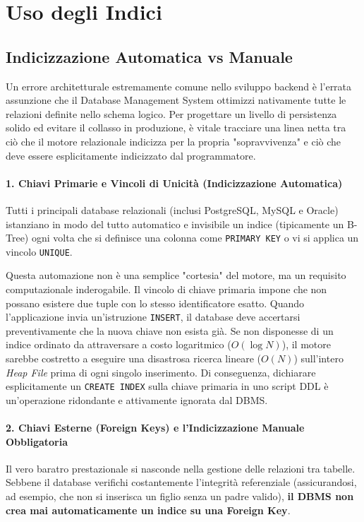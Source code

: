 \section{Uso degli Indici}

\subsection{Indicizzazione Automatica vs Manuale}

Un errore architetturale estremamente comune nello sviluppo backend è l'errata assunzione che il Database Management System ottimizzi nativamente tutte le relazioni definite nello schema logico. Per progettare un livello di persistenza solido ed evitare il collasso in produzione, è vitale tracciare una linea netta tra ciò che il motore relazionale indicizza per la propria "sopravvivenza" e ciò che deve essere esplicitamente indicizzato dal programmatore.

\paragraph{1. Chiavi Primarie e Vincoli di Unicità (Indicizzazione Automatica)}
Tutti i principali database relazionali (inclusi PostgreSQL, MySQL e Oracle) istanziano in modo del tutto automatico e invisibile un indice (tipicamente un B-Tree) ogni volta che si definisce una colonna come \texttt{PRIMARY KEY} o vi si applica un vincolo \texttt{UNIQUE}.

Questa automazione non è una semplice "cortesia" del motore, ma un requisito computazionale inderogabile. Il vincolo di chiave primaria impone che non possano esistere due tuple con lo stesso identificatore esatto. Quando l'applicazione invia un'istruzione \texttt{INSERT}, il database deve accertarsi preventivamente che la nuova chiave non esista già. Se non disponesse di un indice ordinato da attraversare a costo logaritmico ($O(\log N)$), il motore sarebbe costretto a eseguire una disastrosa ricerca lineare ($O(N)$) sull'intero \textit{Heap File} prima di ogni singolo inserimento.
Di conseguenza, dichiarare esplicitamente un \texttt{CREATE INDEX} sulla chiave primaria in uno script DDL è un'operazione ridondante e attivamente ignorata dal DBMS.

\paragraph{2. Chiavi Esterne (Foreign Keys) e l'Indicizzazione Manuale Obbligatoria}
Il vero baratro prestazionale si nasconde nella gestione delle relazioni tra tabelle. Sebbene il database verifichi costantemente l'integrità referenziale (assicurandosi, ad esempio, che non si inserisca un figlio senza un padre valido), \textbf{il DBMS non crea mai automaticamente un indice su una Foreign Key}.


